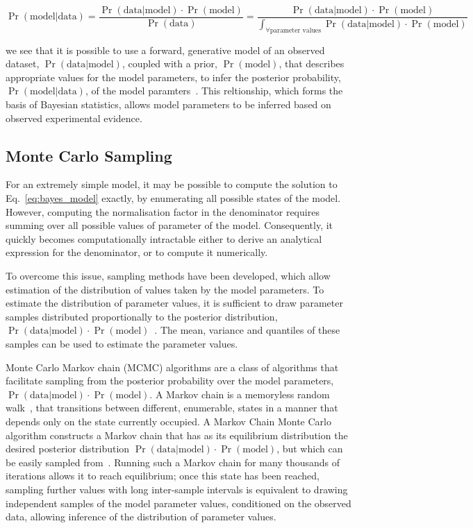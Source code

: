 \begin{equation}
\Pr(\text{model}|\text{data}) = \frac{\Pr(\text{data}|\text{model}) \cdot \Pr(\text{model})}{\Pr(\text{data})} = \frac{\Pr(\text{data}|\text{model}) \cdot \Pr(\text{model})}{\int_{\forall \text{parameter values}}\Pr(\text{data}|\text{model}) \cdot \Pr(\text{model})} 
\label{eq:bayes_model}
\end{equation}

we see that it is possible to use a forward, generative model of an observed dataset, $\Pr(\text{data}|\text{model})$, coupled with a prior, $\Pr(\text{model})$, that describes appropriate values for the model parameters, to infer the posterior probability, $\Pr(\text{model}|\text{data})$, of the model paramters~\cite{barberBRML2012}. This reltionship, which forms the basis of Bayesian statistics, allows model parameters to be inferred based on observed experimental evidence.

\subsection{Monte Carlo Sampling}
For an extremely simple model, it may be possible to compute the solution to Eq.~\ref{eq:bayes_model} exactly, by enumerating all possible states of the model. However, computing the normalisation factor in the denominator requires summing over all possible values of parameter of the model. Consequently, it quickly becomes computationally intractable either to derive an analytical expression for the denominator, or to compute it numerically. 

To overcome this issue, sampling methods have been developed, which allow estimation of the distribution of values taken by the model parameters. To estimate the distribution of parameter values, it is sufficient to draw parameter samples distributed proportionally to the posterior distribution, $\Pr(\text{data}|\text{model}) \cdot \Pr(\text{model})$~\cite{hastings70}. The mean, variance and quantiles of these samples can be used to estimate the parameter values.

Monte Carlo Markov chain (MCMC) algorithms are a class of algorithms that facilitate sampling from the posterior probability over the model parameters, $\Pr(\text{data}|\text{model}) \cdot \Pr(\text{model})$. A Markov chain is a memoryless random walk~\cite{Norris1998}, that transitions between different, enumerable, states in a manner that depends only on the state currently occupied. A Markov Chain Monte Carlo algorithm constructs a Markov chain that has as its equilibrium distribution the desired posterior distribution $\Pr(\text{data}|\text{model}) \cdot \Pr(\text{model})$, but which can be easily sampled from~\cite{Smith1993}. Running such a Markov chain for many thousands of iterations allows it to reach equilibrium; once this state has been reached, sampling further values with long inter-sample intervals is equivalent to drawing independent samples of the model parameter values, conditioned on the observed data, allowing inference of the distribution of parameter values. 

